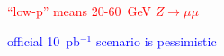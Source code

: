 \documentclass[compress]{beamer}
\begin{document}
\begin{frame}
\begin{columns}
\end{columns}

\vspace{0.25 cm}
\textcolor{red}{``low-p'' means 20-60~GeV $Z\to\mu\mu$}

\textcolor{blue}{official 10~pb$^{-1}$ scenario is pessimistic}
\end{frame}
\end{document}
